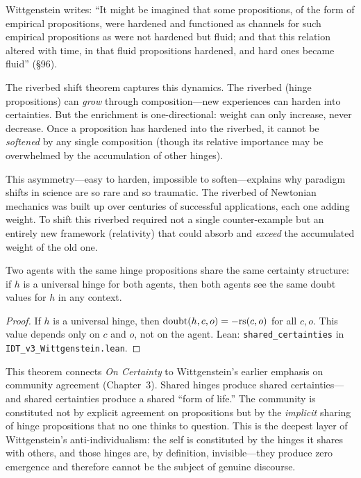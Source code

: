 \begin{interpretation}
Wittgenstein writes: ``It might be imagined that some propositions, of the
form of empirical propositions, were hardened and functioned as channels for
such empirical propositions as were not hardened but fluid; and that this
relation altered with time, in that fluid propositions hardened, and hard ones
became fluid'' (\S96).

The riverbed shift theorem captures this dynamics. The riverbed
(hinge propositions) can \emph{grow} through composition---new experiences
can harden into certainties. But the enrichment is one-directional: weight
can only increase, never decrease. Once a proposition has hardened into the
riverbed, it cannot be \emph{softened} by any single composition (though its
relative importance may be overwhelmed by the accumulation of other hinges).

This asymmetry---easy to harden, impossible to soften---explains why paradigm
shifts in science are so rare and so traumatic. The riverbed of Newtonian
mechanics was built up over centuries of successful applications, each one
adding weight. To shift this riverbed required not a single counter-example
but an entirely new framework (relativity) that could absorb and \emph{exceed}
the accumulated weight of the old one.
\end{interpretation}

\begin{theorem}
\label{thm:shared-certainties}
Two agents with the same hinge propositions share the same certainty structure:
if $h$ is a universal hinge for both agents, then both agents see the same
doubt values for $h$ in any context.
\end{theorem}

\begin{proof}
If $h$ is a universal hinge, then $\mathrm{doubt}(h, c, o) = -\mathrm{rs}(c, o)$
for all $c, o$. This value depends only on $c$ and $o$, not on the agent.
Lean: \texttt{shared\_certainties} in \texttt{IDT\_v3\_Wittgenstein.lean}.
\end{proof}

\begin{interpretation}
This theorem connects \textit{On Certainty} to Wittgenstein's earlier
emphasis on community agreement (Chapter~3). Shared hinges produce shared
certainties---and shared certainties produce a shared ``form of life.'' The
community is constituted not by explicit agreement on propositions but by
the \emph{implicit} sharing of hinge propositions that no one thinks to
question. This is the deepest layer of Wittgenstein's anti-individualism:
the self is constituted by the hinges it shares with others, and those
hinges are, by definition, invisible---they produce zero emergence and
therefore cannot be the subject of genuine discourse.
\end{interpretation}

